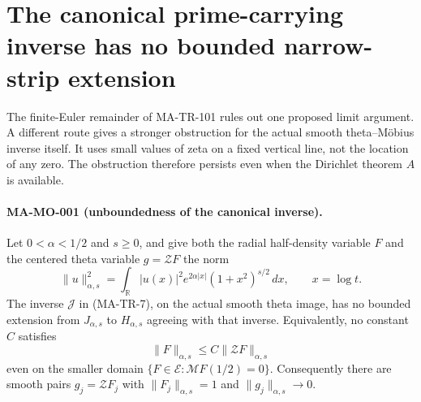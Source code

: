 \section{The canonical prime-carrying inverse has no bounded narrow-strip extension}
\label{sec:mobius-unbounded}

The finite-Euler remainder of MA-TR-101 rules out one proposed
limit argument. A different route gives a stronger obstruction
for the actual smooth theta--M\"obius inverse itself. It uses
small values of zeta on a fixed vertical line, not the location
of any zero. The obstruction therefore persists even when the
Dirichlet theorem $A$ is available.

\paragraph{MA-MO-001 (unboundedness of the canonical inverse).}
Let $0<\alpha<1/2$ and $s\ge0$, and give both the radial
half-density variable $F$ and the centered theta variable
$g=\mathcal ZF$ the norm
\[
 \|u\|_{\alpha,s}^2=
 \int_{\mathbb R}|u(x)|^2
             e^{2\alpha|x|}(1+x^2)^{s/2}\,dx,
 \qquad x=\log t.
 \tag{MA-MO-1}
\]
The inverse $\mathcal J$ in (MA-TR-7), on the actual smooth
theta image, has no bounded extension from
$J_{\alpha,s}$ to $H_{\alpha,s}$ agreeing with that inverse.
Equivalently, no constant $C$ satisfies
\[
        \|F\|_{\alpha,s}\le C\|\mathcal ZF\|_{\alpha,s}
 \tag{MA-MO-2}
\]
even on the smaller domain
$\{F\in\mathcal E:\mathcal MF(1/2)=0\}$.
Consequently there are smooth pairs $g_j=\mathcal ZF_j$ with
$\|F_j\|_{\alpha,s}=1$ and $\|g_j\|_{\alpha,s}\to0$.

